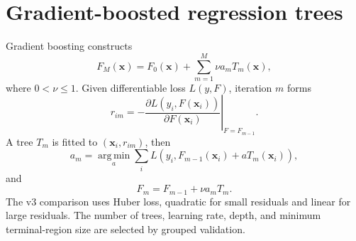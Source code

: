 \documentclass[11pt]{article}
\newcommand{\argmin}{\operatorname*{arg\,min}}
\begin{document}
\section{Gradient-boosted regression trees}
Gradient boosting constructs
\begin{equation}
 F_M(\bm x)=F_0(\bm x)+\sum_{m=1}^{M}\nu a_mT_m(\bm x),
\end{equation}
where $0<\nu\le1$. Given differentiable loss $L(y,F)$, iteration $m$ forms
\begin{equation}
 r_{im}=-\left.\frac{\partial L(y_i,F(\bm x_i))}{\partial F(\bm x_i)}
 \right|_{F=F_{m-1}}.
\end{equation}
A tree $T_m$ is fitted to $(\bm x_i,r_{im})$, then
\begin{equation}
 a_m=\argmin_a\sum_iL(y_i,F_{m-1}(\bm x_i)+aT_m(\bm x_i)),
\end{equation}
and
\begin{equation}
 F_m=F_{m-1}+\nu a_mT_m.
\end{equation}
The v3 comparison uses Huber loss, quadratic for small residuals and linear for large residuals. The number of trees, learning rate, depth, and minimum terminal-region size are selected by grouped validation.
\end{document}
